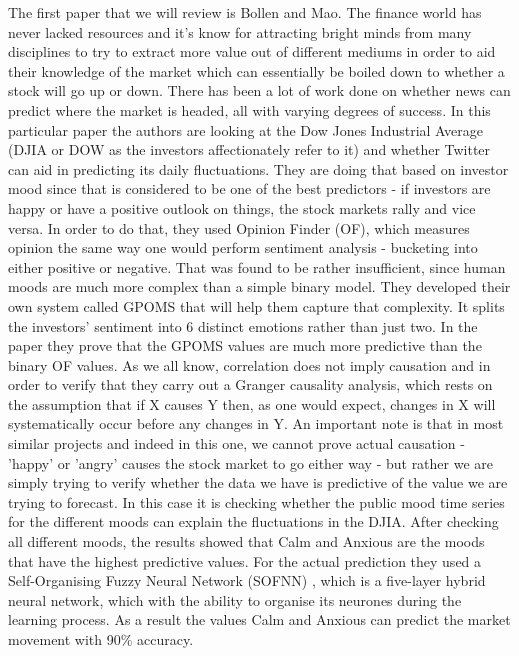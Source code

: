 \documentclass[minf,twoside,singlespacing,parskip,notimes,deptreport]{infthesis} %
\begin{document}
The first paper that we will review is Bollen and Mao\cite{twitstock}. 
The finance world has never lacked resources and it's know for attracting bright minds from many disciplines to try to extract more value out of different mediums in order to aid their knowledge of the market which can essentially be boiled down to whether a stock will go up or down. 
There has been a lot of work done on whether news can predict where the market is headed, all with varying degrees of success. 
In this particular paper the authors are looking at the Dow Jones Industrial Average \cite{dija} (DJIA or DOW as the investors affectionately refer to it) and whether Twitter can aid in predicting its daily fluctuations. 
They are doing that based on investor mood since that is considered to be  one of the best predictors - if investors are happy or have a positive outlook on things, the stock markets rally and vice versa. 
In order to do that, they used Opinion Finder (OF)\cite{opfind}, which measures opinion the same way one would perform sentiment analysis - bucketing into either positive or negative. 
That was found to be rather insufficient, since human moods are much more complex than a simple binary model. 
They developed their own system called GPOMS that will help them capture that complexity. 
It splits the investors' sentiment into 6 distinct emotions rather than just two.
In the paper they prove that the GPOMS values are much more predictive than the binary OF values. 
As we all know, correlation does not imply causation and in order to verify that they carry out a Granger causality analysis\cite{granger}, which rests on the assumption that if X causes Y then, as one would expect, changes in X will systematically occur before any changes in Y. 
An important note is that in most similar projects and indeed in this one, we cannot prove actual causation - 'happy' or 'angry' causes the stock market to go either way - but rather we are simply trying to verify whether the data we have is predictive of the value we are trying to forecast. In this case it is checking whether the public mood time series for the different moods can explain the fluctuations in the DJIA. 
After checking all different moods, the results showed that Calm and Anxious are the moods that have the highest predictive values. 
For the actual prediction they used a Self-Organising Fuzzy Neural Network (SOFNN) \cite{sofnn}, which is a five-layer hybrid neural network, which with the ability to organise its neurones during the learning process. 
As a result the values Calm and Anxious can predict the market movement with 90\% accuracy. 
\end{document}
